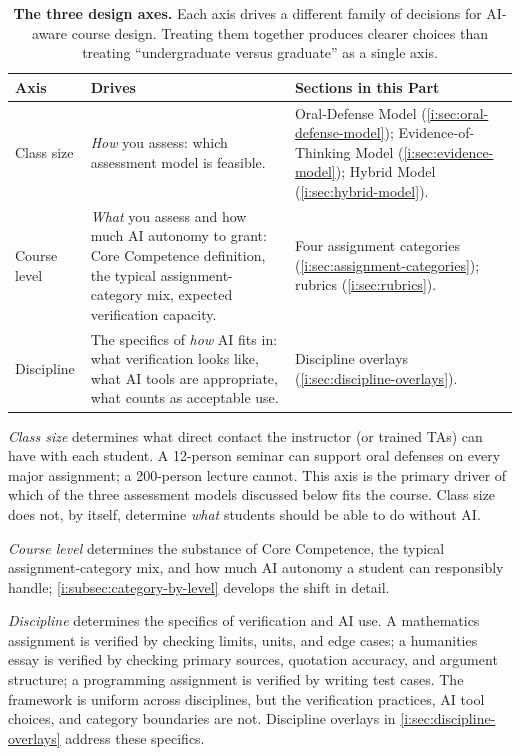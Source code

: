 \documentclass{SIAMbook2023}
\begin{document}
\begin{table}[ht]
\centering
\caption{\textbf{The three design axes.} Each axis drives a different family of decisions for AI-aware course design. Treating them together produces clearer choices than treating ``undergraduate versus graduate'' as a single axis.}
\label{tab:three-axes}
\begin{tabularx}{\textwidth}{>{\raggedright\arraybackslash}X >{\raggedright\arraybackslash}X >{\raggedright\arraybackslash}X}
\toprule
\textbf{Axis} & \textbf{Drives} & \textbf{Sections in this Part} \\
\midrule
Class size & \emph{How} you assess: which assessment model is feasible. & Oral-Defense Model (\cref{i:sec:oral-defense-model}); Evidence-of-Thinking Model (\cref{i:sec:evidence-model}); Hybrid Model (\cref{i:sec:hybrid-model}). \\
\addlinespace
Course level & \emph{What} you assess and how much AI autonomy to grant: Core Competence definition, the typical assignment-category mix, expected verification capacity. & Four assignment categories (\cref{i:sec:assignment-categories}); rubrics (\cref{i:sec:rubrics}). \\
\addlinespace
Discipline & The specifics of \emph{how} AI fits in: what verification looks like, what AI tools are appropriate, what counts as acceptable use. & Discipline overlays (\cref{i:sec:discipline-overlays}). \\
\bottomrule
\end{tabularx}
\end{table}

\textit{Class size} determines what direct contact the instructor (or trained TAs) can have with each student. A 12-person seminar can support oral defenses on every major assignment; a 200-person lecture cannot. This axis is the primary driver of which of the three assessment models discussed below fits the course. Class size does not, by itself, determine \emph{what} students should be able to do without AI.

\textit{Course level} determines the substance of Core Competence, the typical assignment-category mix, and how much AI autonomy a student can responsibly handle; \cref{i:subsec:category-by-level} develops the shift in detail.

\textit{Discipline} determines the specifics of verification and AI use. A mathematics assignment is verified by checking limits, units, and edge cases; a humanities essay is verified by checking primary sources, quotation accuracy, and argument structure; a programming assignment is verified by writing test cases. The framework is uniform across disciplines, but the verification practices, AI tool choices, and category boundaries are not. Discipline overlays in \cref{i:sec:discipline-overlays} address these specifics.
\end{document}
